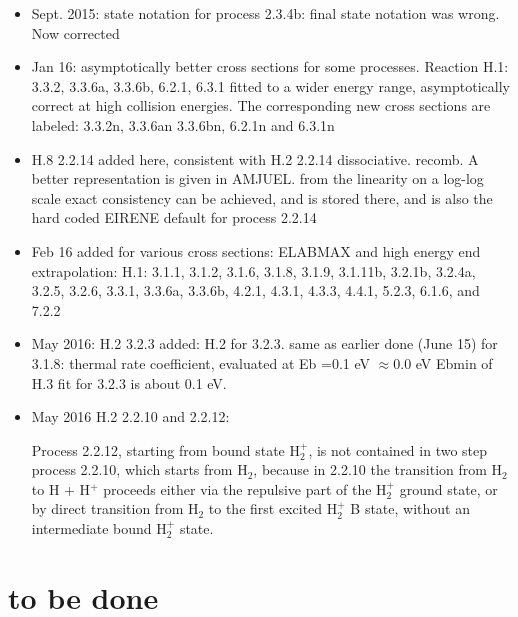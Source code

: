 \documentclass[12pt,dvipdfmx]{article}
\begin{document}
\begin{itemize}
\item{Sept. 2015: state notation for process 2.3.4b: final state notation was wrong.}
Now corrected

\item{Jan 16: asymptotically better cross sections for some processes.}
Reaction H.1:  3.3.2,  3.3.6a,  3.3.6b, 6.2.1,  6.3.1  fitted to a wider energy range, asymptotically correct
at high collision energies.
The corresponding new cross sections are labeled: 3.3.2n, 3.3.6an 3.3.6bn, 6.2.1n and 6.3.1n

\item{H.8  2.2.14 added here, consistent with H.2 2.2.14 dissociative. recomb.}
A better representation is given in AMJUEL. from the linearity on a log-log scale exact consistency
can be achieved, and is stored there, and is also the hard coded EIRENE default for process 2.2.14

\item{Feb 16 added for various cross sections: ELABMAX and high energy end extrapolation:
H.1:  3.1.1, 3.1.2, 3.1.6, 3.1.8, 3.1.9, 3.1.11b, 3.2.1b, 3.2.4a, 3.2.5, 3.2.6, 3.3.1, 3.3.6a, 3.3.6b,
4.2.1, 4.3.1, 4.3.3,  4.4.1, 5.2.3, 6.1.6, and 7.2.2}

\item{May 2016: H.2  3.2.3}
added: H.2 for 3.2.3. same as earlier done (June 15) for 3.1.8: thermal rate coefficient, evaluated at Eb =0.1 eV $\approx 0.0$ eV
Ebmin of H.3 fit for 3.2.3 is about 0.1 eV.

\item{May 2016 H.2 2.2.10 and 2.2.12:}

Process 2.2.12, starting from bound state H$_2^+$, is not contained in two step process 2.2.10,
which starts from H$_2$,
because in 2.2.10 the transition from H$_2$ to H + H$^+$ proceeds either via the repulsive part
of the H$_2^+$ ground state,
or by direct transition from H$_2$ to the first excited H$_2^+$  B state, without an intermediate bound H$_2^+$ state.
\end{itemize}

\section{to be done}
\end{document}
